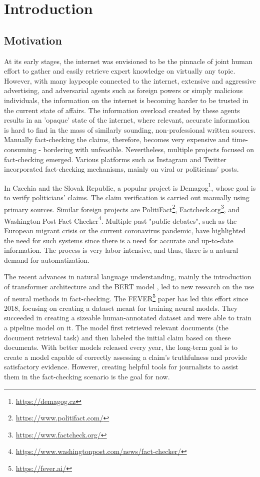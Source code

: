 \chapter*{Introduction}
\section*{Motivation}
At its early stages, the internet was envisioned to be the pinnacle of joint human effort to gather and easily retrieve expert knowledge on virtually any topic.
However, with many laypeople connected to the internet, extensive and aggressive advertising, and adversarial agents such as foreign powers or simply malicious individuals, the information on the internet is becoming harder to be trusted in the current state of affairs.
The information overload created by these agents results in an 'opaque' state of the internet, where relevant, accurate information is hard to find in the mass of similarly sounding, non-professional written sources.
Manually fact-checking the claims, therefore, becomes very expensive and time-consuming - bordering with unfeasible.
Nevertheless, multiple projects focused on fact-checking emerged. 
Various platforms such as Instagram and Twitter incorporated fact-checking mechanisms, mainly on viral or politicians' posts. 

In Czechia and the Slovak Republic, a popular project is Demagog\footnote{\url{https://demagog.cz}}, whose goal is to verify politicians' claims.
The claim verification is carried out manually using primary sources. 
Similar foreign projects are PolitiFact\footnote{\url{https://www.politifact.com/}}, Factcheck.org\footnote{\url{https://www.factcheck.org/}}, and Washington Post Fact Checker\footnote{\url{https://www.washingtonpost.com/news/fact-checker/}}.
Multiple past "public debates", such as the European migrant crisis or the current coronavirus pandemic, have highlighted the need for such systems since there is a need for accurate and up-to-date information.
The process is very labor-intensive, and thus, there is a natural demand for automatization.

The recent advances in natural language understanding, mainly the introduction of transformer architecture \citep{attention-is-all-you-need} and the BERT model \citep{bert}, led to new research on the use of neural methods in fact-checking.
The FEVER\footnote{\url{https://fever.ai/}} paper \citep{fever} has led this effort since 2018, focusing on creating a dataset meant for training neural models.
They succeeded in creating a sizeable human-annotated dataset and were able to train a pipeline model on it.
The model first retrieved relevant documents (the document retrieval task) and then labeled the initial claim based on these documents. 
With better models released every year, the long-term goal is to create a model capable of correctly assessing a claim's truthfulness and provide satisfactory evidence. However, creating helpful tools for journalists to assist them in the fact-checking scenario is the goal for now.

